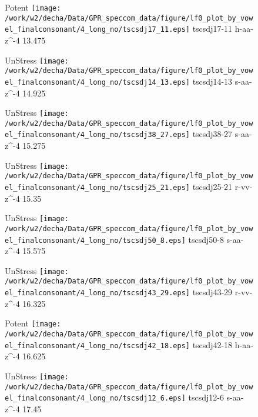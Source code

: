 \documentclass{article}
\begin{document}
\begin{figure}[t]
\begin{minipage}[b]{.24\textwidth}
\colorbox{Apricot}{Potent}
\centering
\texttt{[image: /work/w2/decha/Data/GPR\_speccom\_data/figure/lf0\_plot\_by\_vowel\_finalconsonant/4\_long\_no/tscsdj17\_11.eps]}
tscsdj17-11 h-aa-z\textasciicircum-4 13.475
\end{minipage}
\begin{minipage}[b]{.24\textwidth}
UnStress
\centering
\texttt{[image: /work/w2/decha/Data/GPR\_speccom\_data/figure/lf0\_plot\_by\_vowel\_finalconsonant/4\_long\_no/tscsdj14\_13.eps]}
tscsdj14-13 s-aa-z\textasciicircum-4 14.925
\end{minipage}
\begin{minipage}[b]{.24\textwidth}
UnStress
\centering
\texttt{[image: /work/w2/decha/Data/GPR\_speccom\_data/figure/lf0\_plot\_by\_vowel\_finalconsonant/4\_long\_no/tscsdj38\_27.eps]}
tscsdj38-27 s-aa-z\textasciicircum-4 15.275
\end{minipage}
\begin{minipage}[b]{.24\textwidth}
UnStress
\centering
\texttt{[image: /work/w2/decha/Data/GPR\_speccom\_data/figure/lf0\_plot\_by\_vowel\_finalconsonant/4\_long\_no/tscsdj25\_21.eps]}
tscsdj25-21 r-vv-z\textasciicircum-4 15.35
\end{minipage}
\end{figure}

\begin{figure}[t]
\begin{minipage}[b]{.24\textwidth}
UnStress
\centering
\texttt{[image: /work/w2/decha/Data/GPR\_speccom\_data/figure/lf0\_plot\_by\_vowel\_finalconsonant/4\_long\_no/tscsdj50\_8.eps]}
tscsdj50-8 s-aa-z\textasciicircum-4 15.575
\end{minipage}
\begin{minipage}[b]{.24\textwidth}
UnStress
\centering
\texttt{[image: /work/w2/decha/Data/GPR\_speccom\_data/figure/lf0\_plot\_by\_vowel\_finalconsonant/4\_long\_no/tscsdj43\_29.eps]}
tscsdj43-29 r-vv-z\textasciicircum-4 16.325
\end{minipage}
\begin{minipage}[b]{.24\textwidth}
\colorbox{Apricot}{Potent}
\centering
\texttt{[image: /work/w2/decha/Data/GPR\_speccom\_data/figure/lf0\_plot\_by\_vowel\_finalconsonant/4\_long\_no/tscsdj42\_18.eps]}
tscsdj42-18 h-aa-z\textasciicircum-4 16.625
\end{minipage}
\begin{minipage}[b]{.24\textwidth}
UnStress
\centering
\texttt{[image: /work/w2/decha/Data/GPR\_speccom\_data/figure/lf0\_plot\_by\_vowel\_finalconsonant/4\_long\_no/tscsdj12\_6.eps]}
tscsdj12-6 s-aa-z\textasciicircum-4 17.45
\end{minipage}
\end{figure}
\end{document}
